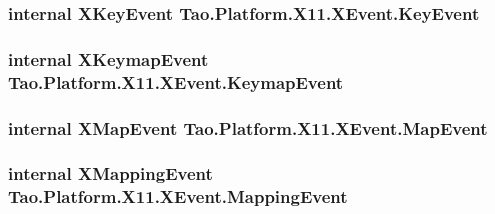 \label{struct_tao_1_1_platform_1_1_x11_1_1_x_event_ab3a1bf9716e55c9836a0f949a919c782}
\hypertarget{struct_tao_1_1_platform_1_1_x11_1_1_x_event_a718790023eb2ebda04b74a00f5a6c33c}{
\subsubsection[{KeyEvent}]{\setlength{\rightskip}{0pt plus 5cm}internal {\bf XKeyEvent} {\bf Tao.Platform.X11.XEvent.KeyEvent}}}
\label{struct_tao_1_1_platform_1_1_x11_1_1_x_event_a718790023eb2ebda04b74a00f5a6c33c}
\hypertarget{struct_tao_1_1_platform_1_1_x11_1_1_x_event_a6425c971a6a060148886a1c0511aad56}{
\subsubsection[{KeymapEvent}]{\setlength{\rightskip}{0pt plus 5cm}internal {\bf XKeymapEvent} {\bf Tao.Platform.X11.XEvent.KeymapEvent}}}
\label{struct_tao_1_1_platform_1_1_x11_1_1_x_event_a6425c971a6a060148886a1c0511aad56}
\hypertarget{struct_tao_1_1_platform_1_1_x11_1_1_x_event_adc232db1e5c6dae079ac74cdcd54cf81}{
\subsubsection[{MapEvent}]{\setlength{\rightskip}{0pt plus 5cm}internal {\bf XMapEvent} {\bf Tao.Platform.X11.XEvent.MapEvent}}}
\label{struct_tao_1_1_platform_1_1_x11_1_1_x_event_adc232db1e5c6dae079ac74cdcd54cf81}
\hypertarget{struct_tao_1_1_platform_1_1_x11_1_1_x_event_aee078cffebd424ad39a7e3a7b74e331f}{
\subsubsection[{MappingEvent}]{\setlength{\rightskip}{0pt plus 5cm}internal {\bf XMappingEvent} {\bf Tao.Platform.X11.XEvent.MappingEvent}}}
\label{struct_tao_1_1_platform_1_1_x11_1_1_x_event_aee078cffebd424ad39a7e3a7b74e331f}
